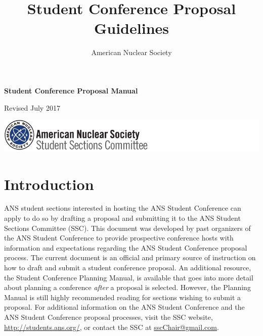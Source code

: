 \documentclass[12pt]{article}
\title{\textbf{Student Conference Proposal Guidelines}}
\author{American Nuclear Society}
\date{}
\begin{document}
\newcommand{\redcolor}{\textcolor{red}}

\begin{titlepage}
\vspace*{2cm}
\centering
{\Huge\bfseries Student Conference Proposal Manual\par}

\vspace{2cm}
\rm{\Large Revised July 2017\par }

\vfill
\includegraphics[scale=0.75]{SSClogo.png}
\end{titlepage}


\clearpage
{\hypersetup{linkcolor=black}
\tableofcontents
}

\newpage

\section{Introduction}

ANS student sections interested in hosting the ANS Student Conference can apply to do
so by drafting a proposal and submitting it to the ANS Student Sections Committee
(SSC). This document was developed by past organizers of the ANS Student Conference
to provide prospective conference hosts with information and expectations regarding the
ANS Student Conference proposal process. The current document is an official and
primary source of instruction on how to draft and submit a student conference proposal.
An additional resource, the Student Conference Planning Manual, is available that goes into more detail about planning a conference \emph{after} a proposal is selected.
However, the Planning Manual is still highly recommended reading for sections wishing to submit a proposal.
For additional information on the ANS Student Conference and the ANS Student Conference proposal processes, visit the SSC website,
\href{http://students.ans.org/}{http://students.ans.org/}, or contact the SSC at \href{mailto:sscChair@gmail.com}{sscChair@gmail.com}.
\end{document}
